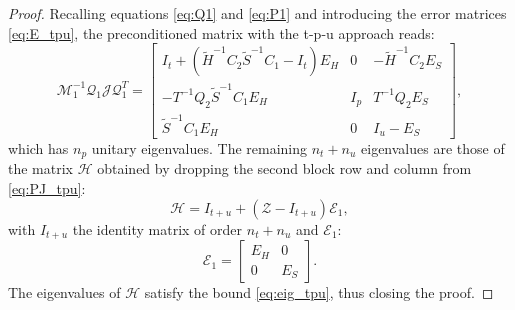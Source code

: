 \documentclass[3p,times]{elsarticle}
\theoremstyle{plain}
\newcommand{\tS}{\widetilde{S}}
\newcommand{\tH}{\widetilde{H}}
\begin{document}
\begin{proof}
Recalling equations \eqref{eq:Q1} and \eqref{eq:P1} and introducing the error matrices \eqref{eq:E_tpu}, the preconditioned matrix with the t-p-u approach reads:
\begin{equation}
    \mathcal{M}_1^{-1} \mathcal{Q}_1 \mathcal{J} \mathcal{Q}_1^T = \left[ \begin{array}{ccc}
    I_t + \left( \tH^{-1} C_2 \tS^{-1} C_1 - I_t \right) E_H & 0 & -\tH^{-1} C_2 E_S \\ -T^{-1} Q_2 \tS^{-1} C_1 E_H & I_p & T^{-1} Q_2 E_S \\ \tS^{-1} C_1 E_H & 0 & I_u - E_S \end{array} \right],
    \label{eq:PJ_tpu}
\end{equation}
which has $n_p$ unitary eigenvalues. The remaining $n_t+n_u$ eigenvalues are those of the matrix $\mathcal{H}$ obtained by dropping the second block row and column from \eqref{eq:PJ_tpu}:
\begin{equation}
    \mathcal{H} = I_{t+u} + \left( \mathcal{Z} - I_{t+u} \right) \mathcal{E}_1,
    \label{eq:Kdef}
\end{equation}
with $I_{t+u}$ the identity matrix of order $n_t+n_u$ and $\mathcal{E}_1$:
\begin{equation}
    \mathcal{E}_1 = \left[ \begin{array}{cc}
    E_H & 0 \\ 0 & E_S \end{array} \right].
    \label{eq:Edef}
\end{equation}
The eigenvalues of $\mathcal{H}$ satisfy the bound \eqref{eq:eig_tpu}, thus closing the proof.
\end{proof}
\end{document}
